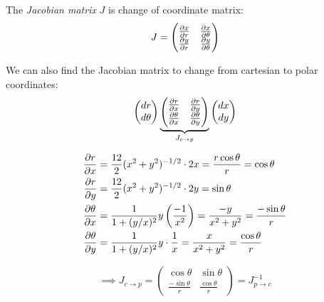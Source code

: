 \documentclass[twoside]{scrartcl}
\begin{document}
\begin{definition}
The \emph{Jacobian matrix} $J$ is change of coordinate matrix:
\[J = \begin{pmatrix}
 \frac{\partial x}{\partial r} & \frac{\partial x}{\partial \theta}\\
 \frac{\partial y }{\partial r} & \frac{\partial y}{\partial \theta}	
 \end{pmatrix}
\]	


\end{definition}

We can also find the Jacobian matrix to change from cartesian to polar coordinates: 
\[\begin{pmatrix}
dr \\ d\theta	
\end{pmatrix}
\underbrace{\begin{pmatrix}
\frac{\partial r}{\partial x} & \frac{\partial r}{\partial y}\\
\frac{\partial \theta}{\partial x} & \frac{\partial \theta}{\partial y}	
\end{pmatrix}}_{J_{c\to p}}
\begin{pmatrix}
dx \\ dy	
\end{pmatrix}
\]

\[
\begin{aligned}
  \frac{\partial r}{\partial x} &= \frac{12}{2}(x^2 + y^2)^{-1/2}\cdot 2x = \frac{r\cos\theta}{r} =\cos\theta\\
  \frac{\partial r}{\partial y} &= \frac{12}{2}(x^2 + y^2)^{-1/2}\cdot 2y = \sin\theta\\
  \frac{\partial \theta}{\partial x} &= \frac{1}{1 + (y/x)^2}y\left(\frac{-1}{x^2}\right) = \frac{-y}{x^2 + y^2} = \frac{-\sin\theta}{r}\\
    \frac{\partial \theta}{\partial y} &= \frac{1}{1 + (y/x)^2}y\cdot\frac{1}{x} = \frac{x}{x^2 + y^2} = \frac{\cos\theta}{r}
\end{aligned}
\]

\[\implies J_{c\to p} = 
\begin{pmatrix}
\cos\theta & \sin\theta\\
\frac{-\sin\theta}{r} & \frac{\cos\theta}{r}	
\end{pmatrix}
= J^{-1}_{p \to c} 
\]
\end{document}
